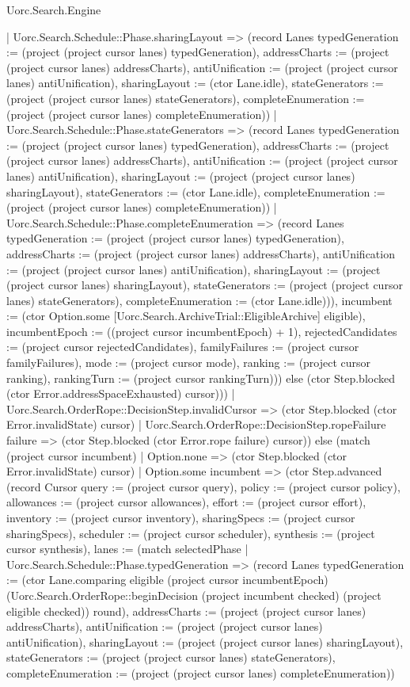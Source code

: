 \begin{lexlean}{Uorc.Search.Engine}
\begin{semanticmodule}
{{          | Uorc.Search.Schedule::Phase.sharingLayout => (record Lanes {typedGeneration := (project (project cursor lanes) typedGeneration), addressCharts := (project (project cursor lanes) addressCharts), antiUnification := (project (project cursor lanes) antiUnification), sharingLayout := (ctor Lane.idle), stateGenerators := (project (project cursor lanes) stateGenerators), completeEnumeration := (project (project cursor lanes) completeEnumeration)})
          | Uorc.Search.Schedule::Phase.stateGenerators => (record Lanes {typedGeneration := (project (project cursor lanes) typedGeneration), addressCharts := (project (project cursor lanes) addressCharts), antiUnification := (project (project cursor lanes) antiUnification), sharingLayout := (project (project cursor lanes) sharingLayout), stateGenerators := (ctor Lane.idle), completeEnumeration := (project (project cursor lanes) completeEnumeration)})
          | Uorc.Search.Schedule::Phase.completeEnumeration => (record Lanes {typedGeneration := (project (project cursor lanes) typedGeneration), addressCharts := (project (project cursor lanes) addressCharts), antiUnification := (project (project cursor lanes) antiUnification), sharingLayout := (project (project cursor lanes) sharingLayout), stateGenerators := (project (project cursor lanes) stateGenerators), completeEnumeration := (ctor Lane.idle)})), incumbent := (ctor Option.some [Uorc.Search.ArchiveTrial::EligibleArchive] eligible), incumbentEpoch := ((project cursor incumbentEpoch) + 1), rejectedCandidates := (project cursor rejectedCandidates), familyFailures := (project cursor familyFailures), mode := (project cursor mode), ranking := (project cursor ranking), rankingTurn := (project cursor rankingTurn)})) else (ctor Step.blocked (ctor Error.addressSpaceExhausted) cursor)))
      | Uorc.Search.OrderRope::DecisionStep.invalidCursor => (ctor Step.blocked (ctor Error.invalidState) cursor)
      | Uorc.Search.OrderRope::DecisionStep.ropeFailure failure => (ctor Step.blocked (ctor Error.rope failure) cursor)) else (match (project cursor incumbent)
      | Option.none => (ctor Step.blocked (ctor Error.invalidState) cursor)
      | Option.some incumbent => (ctor Step.advanced (record Cursor {query := (project cursor query), policy := (project cursor policy), allowances := (project cursor allowances), effort := (project cursor effort), inventory := (project cursor inventory), sharingSpecs := (project cursor sharingSpecs), scheduler := (project cursor scheduler), synthesis := (project cursor synthesis), lanes := (match selectedPhase
        | Uorc.Search.Schedule::Phase.typedGeneration => (record Lanes {typedGeneration := (ctor Lane.comparing eligible (project cursor incumbentEpoch) (Uorc.Search.OrderRope::beginDecision (project incumbent checked) (project eligible checked)) round), addressCharts := (project (project cursor lanes) addressCharts), antiUnification := (project (project cursor lanes) antiUnification), sharingLayout := (project (project cursor lanes) sharingLayout), stateGenerators := (project (project cursor lanes) stateGenerators), completeEnumeration := (project (project cursor lanes) completeEnumeration)})
}}
\end{semanticmodule}
\end{lexlean}
